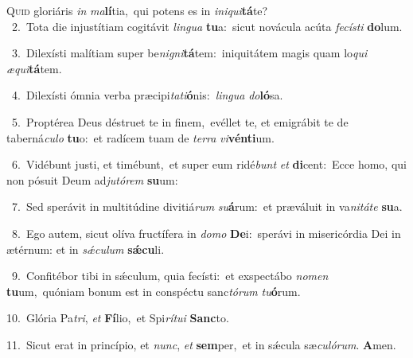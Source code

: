\lettrine{\initial\textcolor{\initialcolor}{Q}}{uid} gloriáris \textit{in} \textit{ma}\-\textbf{lí}tia,~\star qui potens es in \textit{in}\-\textit{i}\textit{qui}\textbf{tá}te?\\
{\numbfont\textcolor{\numbcolor}{~2.}}~Tota die injustítiam cogitávit \textit{lin}\-\textit{gua} \textbf{tu}\-a:~\star sicut novácula acúta \textit{fe}\-\textit{cís}\textit{ti} \textbf{do}\-lum.\par
{\numbfont\textcolor{\numbcolor}{~3.}}~Dilexísti malítiam super be\-\textit{ni}\-\textit{gni}\textbf{tá}tem:~\star iniquitátem magis quam lo\textit{qui} \textit{æ}\-\textit{qui}\textbf{tá}tem.\par
{\numbfont\textcolor{\numbcolor}{~4.}}~Dilexísti ómnia verba præcipi\-\textit{ta}\-\textit{ti}\textbf{ó}nis:~\star \textit{lin}\-\textit{gua} \textit{do}\-\textbf{ló}sa.\par
{\numbfont\textcolor{\numbcolor}{~5.}}~Proptérea Deus déstruet te in finem,~\dagger evéllet te, et emigrábit te de taberná\-\textit{cu}\-\textit{lo} \textbf{tu}\-o:~\star et radícem tuam de \textit{ter}\-\textit{ra} \textit{vi}\-\textbf{vén}\textbf{ti}um.\par
{\numbfont\textcolor{\numbcolor}{~6.}}~Vidébunt justi, et timébunt,~\dagger et super eum ridé\textit{bunt} \textit{et} \textbf{di}\-cent:~\star Ecce homo, qui non pósuit Deum ad\-\textit{ju}\-\textit{tó}\textit{rem} \textbf{su}\-um:\par
{\numbfont\textcolor{\numbcolor}{~7.}}~Sed sperávit in multitúdine divitiá\textit{rum} \textit{su}\-\textbf{á}rum:~\star et præváluit in va\-\textit{ni}\-\textit{tá}\textit{te} \textbf{su}\-a.\par
{\numbfont\textcolor{\numbcolor}{~8.}}~Ego autem, sicut olíva fructífera in \textit{do}\-\textit{mo} \textbf{De}\-i:~\star sperávi in misericórdia Dei in ætérnum: et in \textit{sǽ}\-\textit{cu}\textit{lum} \textbf{sǽ}\-\textbf{cu}li.\par
{\numbfont\textcolor{\numbcolor}{~9.}}~Confitébor tibi in sǽculum, quia fecísti:~\dagger et exspectábo \textit{no}\-\textit{men} \textbf{tu}\-um,~\star quóniam bonum est in conspéctu sanc\-\textit{tó}\-\textit{rum} \textit{tu}\-\textbf{ó}rum.\par
{\numbfont\textcolor{\numbcolor}{10.}}~Glória Pa\-\textit{tri}\-, \textit{et} \textbf{Fí}\-lio,~\star et Spi\-\textit{rí}\-\textit{tu}\textit{i} \textbf{Sanc}\-to.\par
{\numbfont\textcolor{\numbcolor}{11.}}~Sicut erat in princípio, et \textit{nunc}\-, \textit{et} \textbf{sem}\-per,~\star et in sǽcula sæ\-\textit{cu}\-\textit{ló}\textit{rum}. \textbf{A}\-men.\par

